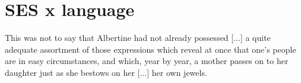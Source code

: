 \documentclass[../thesis.tex]{subfiles}
\begin{document}
\chapter{SES x language}
\label{ch:ses_ling}

\epigraph{
  This was not to say that Albertine had not already possessed [...] a quite
  adequate assortment  of those expressions which reveal at once that one's people are
  in easy circumstances, and which, year by year, a mother passes on to her daughter
  just as she bestows on her [...]
  her own jewels.
}{
}
\end{document}
